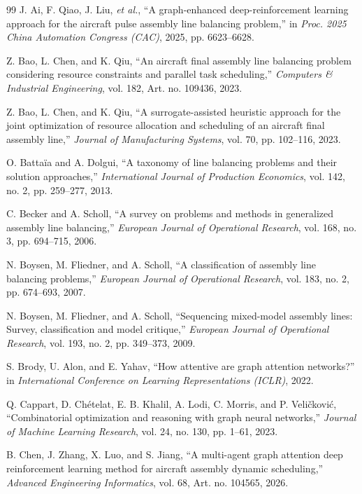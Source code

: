\documentclass[journal,10pt]{IEEEtran}
\begin{document}
\begin{thebibliography}{99}
 J. Ai, F. Qiao, J. Liu, \emph{et al.}, ``A graph-enhanced deep-reinforcement learning approach for the aircraft pulse assembly line balancing problem,'' in \emph{Proc. 2025 China Automation Congress (CAC)}, 2025, pp. 6623--6628.

 Z. Bao, L. Chen, and K. Qiu, ``An aircraft final assembly line balancing problem considering resource constraints and parallel task scheduling,'' \emph{Computers \& Industrial Engineering}, vol. 182, Art. no. 109436, 2023.

 Z. Bao, L. Chen, and K. Qiu, ``A surrogate-assisted heuristic approach for the joint optimization of resource allocation and scheduling of an aircraft final assembly line,'' \emph{Journal of Manufacturing Systems}, vol. 70, pp. 102--116, 2023.

 O. Battaïa and A. Dolgui, ``A taxonomy of line balancing problems and their solution approaches,'' \emph{International Journal of Production Economics}, vol. 142, no. 2, pp. 259--277, 2013.

 C. Becker and A. Scholl, ``A survey on problems and methods in generalized assembly line balancing,'' \emph{European Journal of Operational Research}, vol. 168, no. 3, pp. 694--715, 2006.

 N. Boysen, M. Fliedner, and A. Scholl, ``A classification of assembly line balancing problems,'' \emph{European Journal of Operational Research}, vol. 183, no. 2, pp. 674--693, 2007.

 N. Boysen, M. Fliedner, and A. Scholl, ``Sequencing mixed-model assembly lines: Survey, classification and model critique,'' \emph{European Journal of Operational Research}, vol. 193, no. 2, pp. 349--373, 2009.

 S. Brody, U. Alon, and E. Yahav, ``How attentive are graph attention networks?'' in \emph{International Conference on Learning Representations (ICLR)}, 2022.

 Q. Cappart, D. Chételat, E. B. Khalil, A. Lodi, C. Morris, and P. Veličković, ``Combinatorial optimization and reasoning with graph neural networks,'' \emph{Journal of Machine Learning Research}, vol. 24, no. 130, pp. 1--61, 2023.

 B. Chen, J. Zhang, X. Luo, and S. Jiang, ``A multi-agent graph attention deep reinforcement learning method for aircraft assembly dynamic scheduling,'' \emph{Advanced Engineering Informatics}, vol. 68, Art. no. 104565, 2026.


\end{thebibliography}
\end{document}
